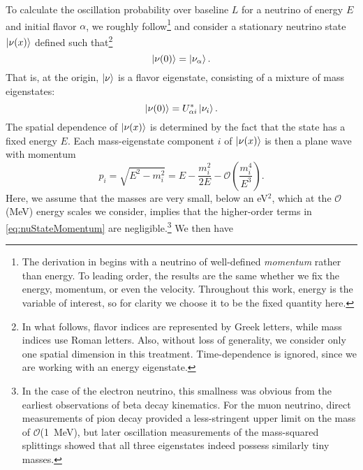 \documentclass[../thesis.tex]{subfiles}
\begin{document}
To calculate the oscillation probability over baseline $L$ for a neutrino of energy
$E$ and initial flavor $\alpha$, we roughly follow\footnote{The derivation in \cite{Giunti_2007} begins with a neutrino of well-defined \emph{momentum} rather than energy. To leading order, the results are the same whether we fix the energy, momentum, or even the velocity. Throughout this work, energy is the variable of interest, so for clarity we choose it to be the fixed quantity here.} \cite{Giunti_2007} and consider a stationary neutrino state $\ket{\nu(x)}$ defined such that\footnote{In what follows, flavor indices are represented by Greek letters, while mass indices use Roman letters. Also, without loss of generality, we consider only one spatial dimension in this treatment. Time-dependence is ignored, since we are working with an energy eigenstate.}
\begin{equation}
  \ket{\nu(0)} = \ket{\nu_\alpha}.
\end{equation}
That is, at the origin, $\ket{\nu}$ is a flavor eigenstate, consisting of a mixture of mass eigenstates:
\begin{equation}
  \label{eq:introOscInitialState}
  \ket{\nu(0)} = U^*_{\alpha i}\ket{\nu_i}.
\end{equation}
The spatial dependence of $\ket{\nu(x)}$ is determined by the fact that the state has a fixed energy $E$. Each mass-eigenstate component $i$ of $\ket{\nu(x)}$ is then a plane wave with momentum
\begin{equation}
  \label{eq:nuStateMomentum}
  p_i = \sqrt{E^2 - m_i^2} = E - \frac{m_i^2}{2E} - \mathcal{O}\left( \frac{m_i^4}{E^3} \right).
\end{equation}
Here, we assume that the masses are very small, below an eV$^2$, which at the $\mathcal{O}$(MeV) energy scales we consider, implies that the higher-order terms in \autoref{eq:nuStateMomentum} are negligible.\footnote{In the case of the electron neutrino, this smallness was obvious from the earliest observations of beta decay kinematics. For the muon neutrino, direct measurements of pion decay \cite{BOOTH196739} provided a less-stringent upper limit on the mass of $\mathcal{O}$(1~MeV), but later oscillation measurements of the mass-squared splittings showed that all three eigenstates indeed possess similarly tiny masses.} We then have
\end{document}
